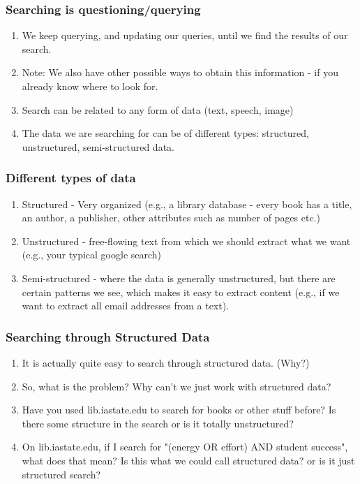 \documentclass{beamer}
\begin{document}
\begin{frame}
\frametitle{Searching is questioning/querying}%
\begin{enumerate}
\item We keep querying, and updating our queries, until we find the results of our search.
\item Note: We also have other possible ways to obtain this information - if you already know where to look for. 
\item Search can be related to any form of data (text, speech, image)
\item The data we are searching for can be of different types: structured, unstructured, semi-structured data.
\end{enumerate}
\end{frame}

\begin{frame}
\frametitle{Different types of data}%
\begin{enumerate}
\item Structured - Very organized (e.g., a library database - every book has a title, an author, a publisher, other attributes such as number of pages etc.)
\item Unstructured - free-flowing text from which we should extract what we want (e.g., your typical google search)
\item Semi-structured - where the data is generally unstructured, but there are certain patterns we see, which makes it easy to extract content (e.g., if we want to extract all email addresses from a text).
\end{enumerate}
\end{frame}

\begin{frame}
\frametitle{Searching through Structured Data}%
\begin{enumerate}
\item It is actually quite easy to search through structured data. (Why?) \pause
\item So, what is the problem? Why can't we just work with structured data? \pause
\item Have you used lib.iastate.edu to search for books or other stuff before? Is there some structure in the search or is it totally unstructured? \pause
\item On lib.iastate.edu, if I search for "(energy OR effort) AND student success", what does that mean? Is this what we could call structured data? or is it just structured search?
\end{enumerate}
\end{frame}
\end{document}

